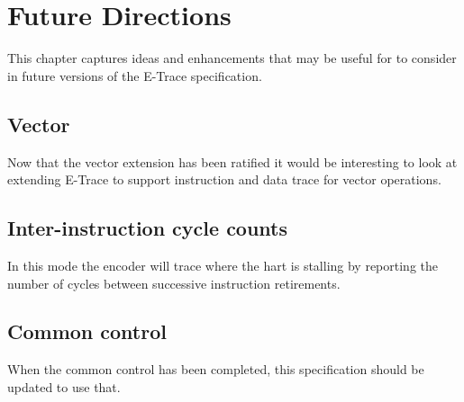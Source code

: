 \chapter{Future Directions} \label{futureIdeas}

This chapter captures ideas and enhancements that may be useful for to consider in future versions of the E-Trace specification.


\section{Vector}

Now that the vector extension has been ratified it would be interesting to look at extending E-Trace to support instruction and data trace for vector operations.

\section{Inter-instruction cycle counts}

In this mode the encoder will trace where the hart is stalling by
reporting the number of cycles between successive instruction
retirements.

\section{Common control}

When the common control has been completed, this specification should be updated to use that.


